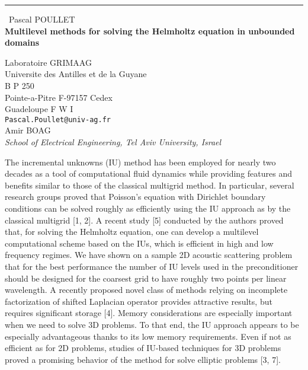\documentclass{report}
\begin{document}
\begin{center}
\rule{6in}{1pt} \
{\large Pascal POULLET \\
{\bf Multilevel methods for solving the Helmholtz equation in unbounded domains}}

Laboratoire GRIMAAG \\ Universite des Antilles et de la Guyane \\ B P 250 \\ Pointe-a-Pitre F-97157 Cedex \\ Guadeloupe F W I
\\
{\tt Pascal.Poullet@univ-ag.fr}\\
Amir BOAG\\
{\em School of Electrical Engineering, Tel Aviv University, Israel}\end{center}

The incremental unknowns (IU) method has been employed for nearly
two decades as a tool of computational fluid dynamics while providing
features and benefits similar to those of the classical multigrid method.
In particular, several research groups proved that Poisson's equation
with Dirichlet boundary conditions can be solved roughly as efficiently
using the IU approach as by the classical multigrid [1, 2].
A recent study [5] conducted by the authors proved that,
for solving the Helmholtz equation, one can develop a multilevel
computational scheme based on the IUs, which is efficient in high and low
frequency regimes.
We have shown on a sample 2D acoustic scattering problem that for the
best performance the number of IU levels used in the preconditioner
should be designed for the coarsest grid to have roughly two points per
linear wavelength. A recently proposed novel class of methods relying on
incomplete factorization of shifted Laplacian operator provides
attractive results, but
requires significant storage [4]. Memory considerations are especially
important when we need to solve 3D problems. To that end, the IU approach
appears to be especially advantageous thanks to its low memory
requirements. Even if not as efficient as for 2D problems, studies of
IU-based techniques for 3D problems proved a promising behavior of the
method for solve elliptic problems [3, 7].
\end{document}
